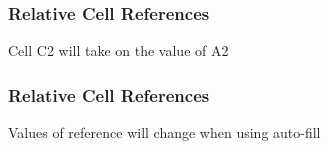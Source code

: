 \documentclass[color=usenames,dvipsnames]{beamer}\usepackage[]{graphicx}\usepackage[]{color}
\begin{document}
\begin{frame}
  \frametitle{Relative Cell References}
  \begin{center}
    Cell C2 will take on the value of A2
  \end{center}
\end{frame}


\begin{frame}
  \frametitle{Relative Cell References}
  \begin{center}
    Values of reference will change when using auto-fill
  \end{center}
\end{frame}
\end{document}
